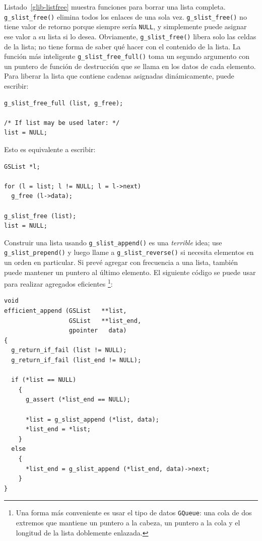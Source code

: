 Listado~\ref{glib-listfree} muestra funciones para borrar una lista completa. \lstinline{g_slist_free()} elimina todos los enlaces de una sola vez. \lstinline{g_slist_free()} no tiene valor de retorno porque siempre sería \lstinline{NULL}, y simplemente puede asignar ese valor a su lista si lo desea. Obviamente, \lstinline{g_slist_free()} libera solo las celdas de la lista; no tiene forma de saber qué hacer con el contenido de la lista. La función más inteligente \lstinline{g_slist_free_full()} toma un segundo argumento con un puntero de función de destrucción que se llama en los datos de cada elemento. Para liberar la lista que contiene cadenas asignadas dinámicamente, puede escribir:
\begin{lstlisting}
g_slist_free_full (list, g_free);

/* If list may be used later: */
list = NULL;
\end{lstlisting}

Esto es equivalente a escribir:
\begin{lstlisting}
GSList *l;

for (l = list; l != NULL; l = l->next)
  g_free (l->data);

g_slist_free (list);
list = NULL;
\end{lstlisting}

Construir una lista usando \lstinline{g_slist_append()} es una \emph{terrible} idea; use \lstinline{g_slist_prepend()} y luego llame a \lstinline{g_slist_reverse()} si necesita elementos en un orden en particular. Si prevé agregar con frecuencia a una lista, también puede mantener un puntero al último elemento. El siguiente código se puede usar para realizar agregados eficientes \footnote{Una forma más conveniente es usar el tipo de datos \lstinline{GQueue}: una cola de dos extremos que mantiene un puntero a la cabeza, un puntero a la cola y el longitud de la lista doblemente enlazada.}:

\pagebreak[2]
\begin{lstlisting}
void
efficient_append (GSList   **list,
                  GSList   **list_end,
                  gpointer   data)
{
  g_return_if_fail (list != NULL);
  g_return_if_fail (list_end != NULL);

  if (*list == NULL)
    {
      g_assert (*list_end == NULL);

      *list = g_slist_append (*list, data);
      *list_end = *list;
    }
  else
    {
      *list_end = g_slist_append (*list_end, data)->next;
    }
}
\end{lstlisting}

